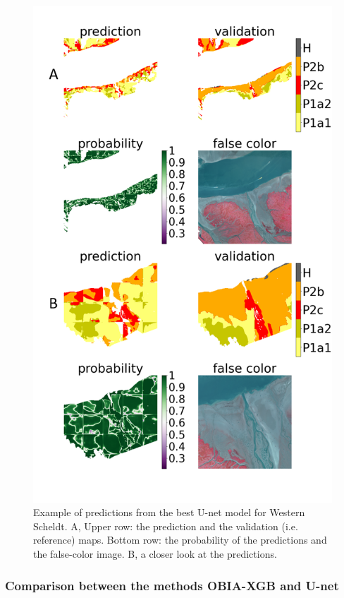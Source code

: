 \documentclass{isprs} %
\begin{document}
\begin{figure}
    \centering
    \includegraphics[scale=0.2]{figures/prediction_merged.png}
    \caption{Example of predictions from the best U-net model for Western Scheldt. A, Upper row: the prediction and the validation (i.e. reference) maps. Bottom row: the probability of the predictions and the false-color image. B, a closer look at the predictions. }
    \label{fig:deepsp}
\end{figure}

\subsubsection{Comparison between the methods OBIA-XGB and U-net}
\end{document}
